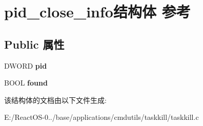\hypertarget{structpid__close__info}{}\section{pid\+\_\+close\+\_\+info结构体 参考}
\label{structpid__close__info}
\subsection*{Public 属性}
\begin{DoxyCompactItemize}
\item 
\mbox{\label{structpid__close__info_a66cdc0e2e0d14c8623e85468a2e5fa59}} 
D\+W\+O\+RD {\bfseries pid}
\item 
\mbox{\label{structpid__close__info_a10b67fba2a84f6f1648b4d590927a475}} 
B\+O\+OL {\bfseries found}
\end{DoxyCompactItemize}


该结构体的文档由以下文件生成\+:\begin{DoxyCompactItemize}
\item 
E\+:/\+React\+O\+S-\/0../base/applications/cmdutils/taskkill/taskkill.\+c\end{DoxyCompactItemize}
